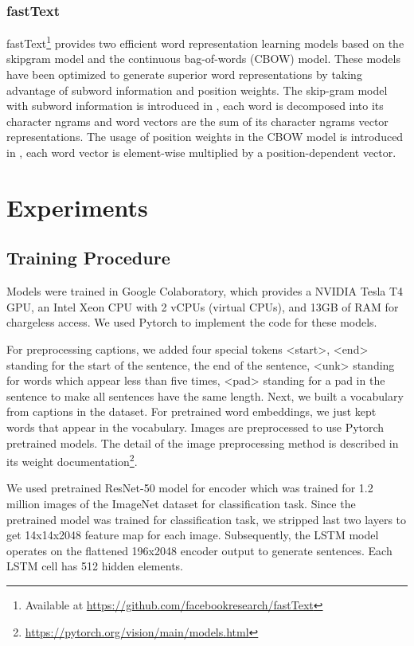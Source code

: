 \documentclass[conference]{IEEEtran}
\begin{document}
\subsubsection{fastText}  
fastText\footnote{Available at \url{https://github.com/facebookresearch/fastText}} provides two efficient word representation learning models based on the skipgram model and the continuous bag-of-words (CBOW) model\cite{mikolov2013efficient}. These models have been optimized to generate superior word representations by taking advantage of subword information and position weights. The skip-gram model with subword information is introduced in \cite{bojanowski2017enriching}, each word is decomposed into its character ngrams and word vectors are the sum of its character ngrams vector representations. The usage of position weights in the CBOW model is introduced in \cite{mnih2013learning}, each word vector is element-wise multiplied by a position-dependent vector.   



\section{Experiments}
\subsection{Training Procedure\label{implement}}
Models were trained in Google Colaboratory, which provides a NVIDIA Tesla T4 GPU, an Intel Xeon CPU with 2 vCPUs (virtual CPUs), and 13GB of RAM for chargeless access. We used Pytorch to implement the code for these models.  

For preprocessing captions, we added four special tokens <start>, <end> standing for the start of the sentence, the end of the sentence, <unk> standing for words which appear less than five times, <pad> standing for a pad in the sentence to make all sentences have the same length. Next, we built a vocabulary from captions in the dataset. For pretrained word embeddings, we just kept words that appear in the vocabulary. Images are preprocessed to use Pytorch pretrained models. The detail of the image preprocessing method is described in its weight documentation\footnote{\url{https://pytorch.org/vision/main/models.html}}. 

We used pretrained ResNet-50 model for encoder which was trained for 1.2 million images of the ImageNet dataset for classification task. Since the pretrained model was trained for classification task, we stripped last two layers to get 14x14x2048 feature map for each image. Subsequently, the LSTM model operates on the flattened 196x2048 encoder output to generate sentences. Each LSTM cell has 512 hidden elements. 
\end{document}
